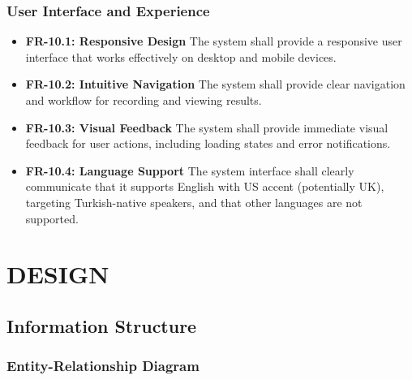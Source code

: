 \documentclass[a4paper,12pt]{report}
\begin{document}
\subsection{User Interface and Experience}
\begin{itemize}
    \item \textbf{FR-10.1: Responsive Design} The system shall provide a responsive user interface that works effectively on desktop and mobile devices.
    \item \textbf{FR-10.2: Intuitive Navigation} The system shall provide clear navigation and workflow for recording and viewing results.
    \item \textbf{FR-10.3: Visual Feedback} The system shall provide immediate visual feedback for user actions, including loading states and error notifications.
    \item \textbf{FR-10.4: Language Support} The system interface shall clearly communicate that it supports English with US accent (potentially UK), targeting Turkish-native speakers, and that other languages are not supported.
\end{itemize}

\chapter{DESIGN}

\section{Information Structure}

\subsection{Entity-Relationship Diagram}
\end{document}
